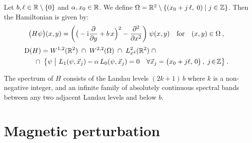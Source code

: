 \begin{defn}
    Let $b, \ell \in \mathbb{R} \setminus \{0\}$ and $\alpha, x_0 \in \mathbb{R}$. We define $\Omega = \mathbb{R}^2 \setminus \{ (x_0 + j \, \ell, \; 0) \;|\; j \in \mathbb{Z} \}$. Then the Hamiltonian is given by:
    \begin{equation*}
        \big( H\psi \big)(x, y)
        = \bigg(
            \big(-\mathrm{i}\frac{\partial }{\partial y} + b \, x \Big)^2 - \frac{\partial ^2}{\partial x^2}
        \bigg) \; \psi(x, y)
        \quad
        \text{for}
        \quad
        (x, y) \in \Omega
        \: ,
    \end{equation*}
    \begin{align*}
        \Domain(H)
        &= W^{1,2}(\R^2)
        \;\cap\; W^{2,2}(\Omega)
        \;\cap\; L^2_{x^4}(\R^2)
        \;\cap \\
        &\hspace{-10pt}
        \cap\;
        \big\{
            \psi
            \;\big|\
            L_1(\psi, \vec x_j)
            - \alpha \, L_0(\psi, \vec x_j)
            = 0
            \quad
            \forall \vec x_j =
            \big( x_0 + j \ell, \, 0 \big)
            \: ,
            \; j \!\in\! \Z
        \big\}
        \:.
    \end{align*}
\end{defn}
\begin{thm}
    The spectrum of $H$ consists of the Landau levels $(2k + 1) \, b$ where $k$ is a non-negative integer, and an infinite family of absolutely continuous spectral bands between any two adjacent Landau levels and below $b$.
\end{thm}

\section{Magnetic perturbation}
\label{section-known-magnetic}

